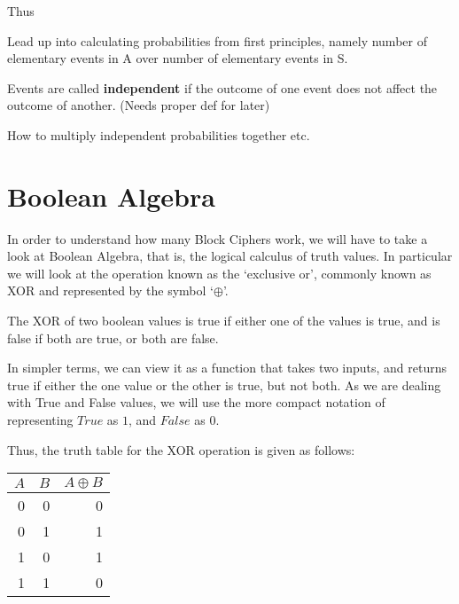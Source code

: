 Thus

Lead up into calculating probabilities from first principles, namely number
of elementary events in A over number of elementary events in S.

\begin{defn}
Events are called \textbf{independent} if the outcome of one event does
not affect the outcome of another. (Needs proper def for later)
\end{defn}
\begin{comment}
and event to have a probability of occurring, how we calculate 
an event's probability of occurring, and how likely an
event is, or string of random events are to occur.
\end{comment}

How to multiply independent probabilities together etc.

\section{Boolean Algebra}
In order to understand how many Block Ciphers work, we will have to take a 
look at Boolean Algebra, that is, the logical calculus of truth values.
In particular we will look at the operation known as the `exclusive or', 
commonly known as XOR and represented by the symbol `$\oplus$'.

\begin{defn}
The XOR of two boolean values is true if either one of the values is true,
and is false if both are true, or both are false.
\end{defn}
In simpler terms, we can view it as a function that takes two inputs, and 
returns true if either the one value or the other is true, but not both.
As we are dealing with True and False values, we will use the more compact
notation of representing $True$ as $1$, and $False$ as $0$. 

Thus, the truth table for the XOR operation is given as follows:
\begin{center}
\begin{tabular}{|r|r|r|}
\hline
$A$ & $B$ & $A \oplus B$ \\\hline
0 & 0 & 0 \\\hline
0 & 1 & 1 \\\hline
1 & 0 & 1 \\\hline
1 & 1 & 0 \\\hline
\end{tabular}
\end{center}


